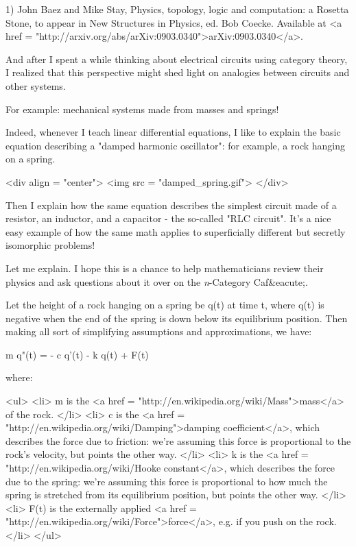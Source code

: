 1) John Baez and Mike Stay, Physics, topology, logic and computation:
a Rosetta Stone, to appear in New Structures in Physics, ed. Bob
Coecke.  Available at <a href = "http://arxiv.org/abs/arXiv:0903.0340">arXiv:0903.0340</a>.

And after I spent a while thinking about electrical circuits using
category theory, I realized that this perspective might shed light on
analogies between circuits and other systems.

For example: mechanical systems made from masses and springs!  

Indeed, whenever I teach linear differential equations, I like to
explain the basic equation describing a "damped harmonic
oscillator": for example, a rock hanging on a spring.

<div align = "center">
<img src = "damped_spring.gif">
</div>

Then I explain how the same equation describes the simplest circuit
made of a resistor, an inductor, and a capacitor - the so-called
"RLC circuit".  It's a nice easy example of how the same
math applies to superficially different but secretly isomorphic
problems!

Let me explain.  I hope this is a chance to help mathematicians review
their physics and ask questions about it over on the \emph{n}-Category 
Caf&eacute;.

Let the height of a rock hanging on a spring be q(t) at time t, where
q(t) is negative when the end of the spring is down below its
equilibrium position.  Then making all sort of simplifying assumptions
and approximations, we have:

m q"(t) = - c q'(t) - k q(t) + F(t)

where:

<ul>
<li>
   m is the <a href = "http://en.wikipedia.org/wiki/Mass">mass</a> of the rock.
</li>
<li>
   c is the <a href = "http://en.wikipedia.org/wiki/Damping">damping 
   coefficient</a>, which describes the force due to
   friction: we're assuming this force is proportional to the rock's
   velocity, but points the other way.
</li>
<li>
   k is the <a href = "http://en.wikipedia.org/wiki/Hooke%
   constant</a>, which describes the force due to the
   spring: we're assuming this force is proportional to how much the
   spring is stretched from its equilibrium position, but points the
   other way.
</li>
<li>
   F(t) is the externally applied <a href =
   "http://en.wikipedia.org/wiki/Force">force</a>, e.g. if you push on
   the rock.  
</li> 
</ul>

